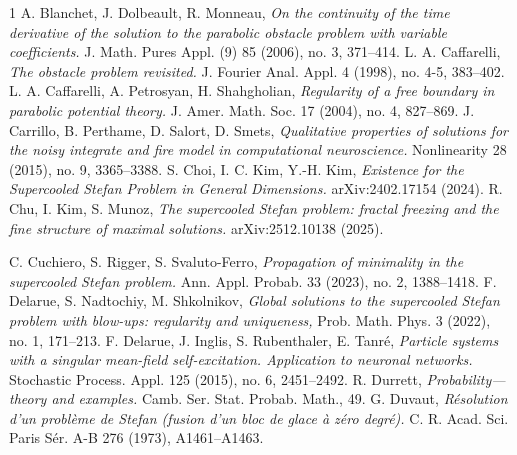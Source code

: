 \documentclass{article}
\numberwithin{equation}{section}
\numberwithin{figure}{section}
\theoremstyle{plain}
\theoremstyle{plain}
\theoremstyle{plain}
\theoremstyle{plain}
\theoremstyle{definition}
\theoremstyle{remark}
\begin{document}
\begin{thebibliography}{1}
 A. Blanchet, J. Dolbeault,  R. Monneau, {\it On the continuity of the time derivative of the solution to the parabolic obstacle problem with variable coefficients.} J. Math. Pures Appl. (9) 85 (2006), no. 3, 371–414.
 L. A. Caffarelli, {\it The obstacle problem revisited.} J. Fourier Anal. Appl. 4 (1998), no. 4-5, 383–402.
 L. A. Caffarelli, A. Petrosyan, H. Shahgholian, {\it Regularity of a free boundary in parabolic potential theory.} 
J. Amer. Math. Soc. 17 (2004), no. 4, 827–869.
 J. Carrillo, B. Perthame, D. Salort, D. Smets,  {\it Qualitative properties of solutions for the noisy integrate and fire model in computational neuroscience.} Nonlinearity 28 (2015), no. 9, 3365–3388.
 S. Choi, I. C. Kim, Y.-H. Kim, {\it Existence for the Supercooled Stefan Problem in General Dimensions.} 	arXiv:2402.17154 (2024).
 R. Chu, I. Kim, S. Munoz, {\it The supercooled Stefan problem: fractal freezing and the fine structure of maximal solutions.} arXiv:2512.10138 (2025).

 C. Cuchiero, S. Rigger, S. Svaluto-Ferro, {\it Propagation of minimality in the supercooled Stefan problem.} Ann. Appl. Probab. 33 (2023), no. 2, 1388–1418.
 F. Delarue, S. Nadtochiy, M. Shkolnikov, {\it Global solutions to the supercooled Stefan problem with blow-ups: regularity and uniqueness,} Prob. Math. Phys. 3 (2022), no. 1, 171--213. 
 F. Delarue, J. Inglis, S. Rubenthaler, E. Tanr\'e, {\it Particle systems with a singular mean-field self-excitation. Application to neuronal networks.} Stochastic Process. Appl. 125 (2015), no. 6, 2451–2492.
 R. Durrett, {\it Probability—theory and examples.} Camb. Ser. Stat. Probab. Math., 49.
 G. Duvaut, {\it Résolution d'un problème de Stefan (fusion d'un bloc de glace à zéro degré).} C. R. Acad. Sci. Paris Sér. A-B 276 (1973), A1461–A1463.


\end{thebibliography}
\end{document}
